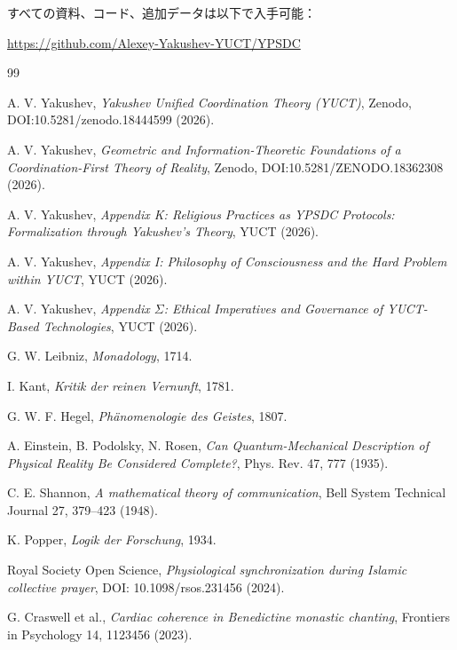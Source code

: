\documentclass[11pt,a4paper]{article}
\begin{document}
	すべての資料、コード、追加データは以下で入手可能：
	\begin{center}
		\url{https://github.com/Alexey-Yakushev-YUCT/YPSDC}
	\end{center}
	
	\begin{thebibliography}{99}
		
		A. V. Yakushev, \emph{Yakushev Unified Coordination Theory (YUCT)}, Zenodo, DOI:10.5281/zenodo.18444599 (2026).
		
		A. V. Yakushev, \emph{Geometric and Information-Theoretic Foundations of a Coordination-First Theory of Reality}, Zenodo, DOI:10.5281/ZENODO.18362308 (2026).
		
		A. V. Yakushev, \emph{Appendix K: Religious Practices as YPSDC Protocols: Formalization through Yakushev's Theory}, YUCT (2026).
		
		A. V. Yakushev, \emph{Appendix I: Philosophy of Consciousness and the Hard Problem within YUCT}, YUCT (2026).
		
		A. V. Yakushev, \emph{Appendix \(\Sigma\): Ethical Imperatives and Governance of YUCT-Based Technologies}, YUCT (2026).
		
		G. W. Leibniz, \emph{Monadology}, 1714.
		
		I. Kant, \emph{Kritik der reinen Vernunft}, 1781.
		
		G. W. F. Hegel, \emph{Phänomenologie des Geistes}, 1807.
		
		A. Einstein, B. Podolsky, N. Rosen, \emph{Can Quantum-Mechanical Description of Physical Reality Be Considered Complete?}, Phys. Rev. 47, 777 (1935).
		
		C. E. Shannon, \emph{A mathematical theory of communication}, Bell System Technical Journal 27, 379--423 (1948).
		
		K. Popper, \emph{Logik der Forschung}, 1934.
		
		Royal Society Open Science, \emph{Physiological synchronization during Islamic collective prayer}, DOI: 10.1098/rsos.231456 (2024).
		
		G. Craswell et al., \emph{Cardiac coherence in Benedictine monastic chanting}, Frontiers in Psychology 14, 1123456 (2023).
		

\end{thebibliography}
\end{document}
